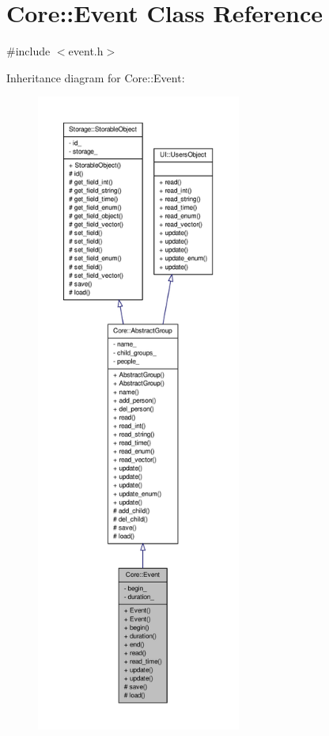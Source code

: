 \hypertarget{classCore_1_1Event}{
\section{Core::Event Class Reference}
\label{d9/d42/classCore_1_1Event}
}


{\ttfamily \#include $<$event.h$>$}



Inheritance diagram for Core::Event:
\nopagebreak
\begin{figure}[H]
\begin{center}
\leavevmode
\includegraphics[height=600pt]{d2/d0e/classCore_1_1Event__inherit__graph}
\end{center}
\end{figure}


